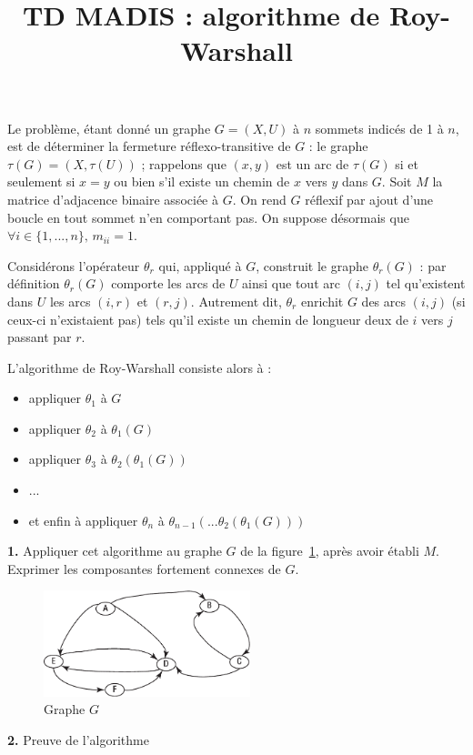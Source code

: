 \documentclass{article}
\title{\textbf{TD MADIS : algorithme de Roy-Warshall}}
\begin{document}
\maketitle

Le problème, étant donné un graphe $G=(X,U)$ à $n$ sommets indicés de
1 à $n$, est de déterminer la fermeture réflexo-transitive de $G$ : le
graphe $\tau(G) = (X,\tau(U))$ ; rappelons que $(x,y)$ est un arc de
$\tau(G)$ si et seulement si $x=y$ ou bien s'il existe un chemin de
$x$ vers $y$ dans $G$. Soit $M$ la matrice d'adjacence binaire associée à $G$.
On rend $G$ réflexif par ajout d'une boucle en tout sommet n'en
comportant pas. On suppose désormais que $\forall i \in \{1,...,n\}
\mbox{, } m_{ii}=1$.

Considérons l'opérateur $\theta_r$ qui, appliqué à $G$, construit le
graphe $\theta_r(G)$ : par définition $\theta_r(G)$ comporte les arcs
de $U$ ainsi que tout arc $(i,j)$ tel qu'existent dans $U$ les arcs
$(i,r)$ et $(r,j)$. Autrement dit, $\theta_r$ enrichit $G$ des arcs
$(i,j)$ (si ceux-ci n'existaient pas) tels qu'il existe un chemin de
longueur deux de $i$ vers $j$ passant par $r$.

L'algorithme de Roy-Warshall consiste alors à :
\begin{itemize}
\item appliquer $\theta_1$ à $G$
\item appliquer $\theta_2$ à $\theta_1(G)$
\item appliquer $\theta_3$ à $\theta_2(\theta_1(G))$
\item ...
\item et enfin à appliquer $\theta_n$ à $\theta_{n-1}(...\theta_2(\theta_1(G)))$
\end{itemize}


\textbf{1. }Appliquer cet algorithme au graphe $G$ de la figure~\ref{fig:graphe},
après avoir établi $M$. Exprimer les composantes fortement connexes de
$G$.

\begin{figure}[htbp]
  \begin{center}
    \includegraphics[width=6cm]{td_rw_pdf.pdf}
    \caption{Graphe $G$}
    \label{fig:graphe}
  \end{center}
\end{figure}
\textbf{2. } Preuve de l'algorithme
\end{document}
